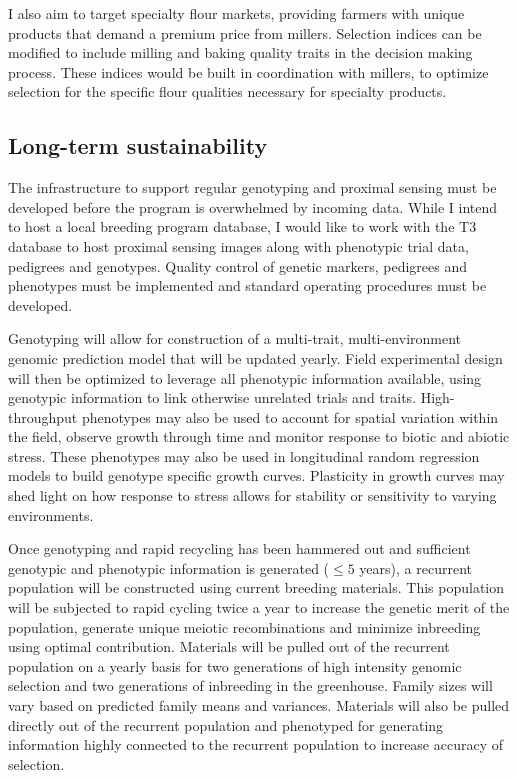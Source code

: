 \documentclass[11pt]{article}
\begin{document}
I also aim to target specialty flour markets, providing farmers with unique products that demand a premium price from millers. Selection indices can be modified to include milling and baking quality traits in the decision making process. These indices would be built in coordination with millers, to optimize selection for the specific flour qualities necessary for specialty products.



\subsection*{Long-term sustainability}

The infrastructure to support regular genotyping and proximal sensing must be developed before the program is overwhelmed by incoming data. While I intend to host a local breeding program database, I would like to work with the T3 database to host proximal sensing images along with phenotypic trial data, pedigrees and genotypes. Quality control of genetic markers, pedigrees and phenotypes must be implemented and standard operating procedures must be developed. 

Genotyping will allow for construction of a multi-trait, multi-environment genomic prediction model that will be updated yearly. Field experimental design will then be optimized to leverage all phenotypic information available, using genotypic information to link otherwise unrelated trials and traits. High-throughput phenotypes may also be used to account for spatial variation within the field, observe growth through time and monitor response to biotic and abiotic stress. These phenotypes may also be used in longitudinal random regression models to build genotype specific growth curves. Plasticity in growth curves may shed light on how response to stress allows for stability or sensitivity to varying environments.

Once genotyping and rapid recycling has been hammered out and sufficient genotypic and phenotypic information is generated ($\leq 5$ years), a recurrent population will be constructed using current breeding materials. This population will be subjected to rapid cycling twice a year to increase the genetic merit of the population, generate unique meiotic recombinations and minimize inbreeding using optimal contribution. Materials will be pulled out of the recurrent population on a yearly basis for two generations of high intensity genomic selection and two generations of inbreeding in the greenhouse. Family sizes will vary based on predicted family means and variances. Materials will also be pulled directly out of the recurrent population and phenotyped for generating information highly connected to the recurrent population to increase accuracy of selection. 
\end{document}
